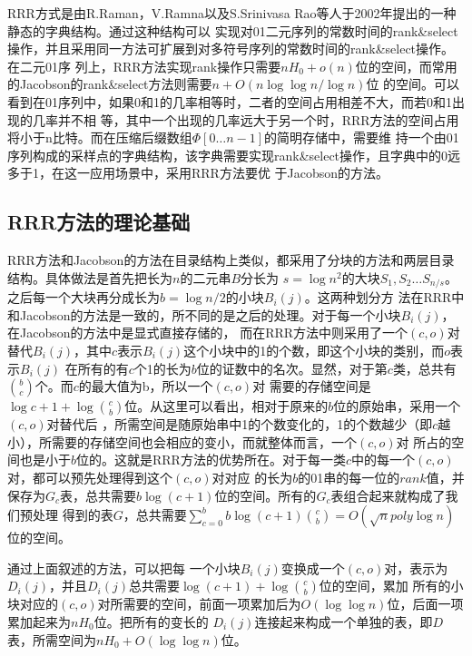 RRR方式是由R.Raman，V.Ramna以及S.Srinivasa Rao等人于2002年提出的一种静态的字典结构\cite{raman2002succinct}。通过这种结构可以
实现对01二元序列的常数时间的rank\&select操作，并且采用同一方法可扩展到对多符号序列的常数时间的rank\&select操作。在二元01序
列上，RRR方法实现rank操作只需要$nH_0 + o(n)$位的空间，而常用的Jacobson的rank\&select方法则需要$n + O(n\log\log n/\log n)$位
的空间\cite{jacobson1989space}。可以看到在01序列中，如果0和1的几率相等时，二者的空间占用相差不大，而若0和1出现的几率并不相
等，其中一个出现的几率远大于另一个时，RRR方法的空间占用将小于n比特。而在压缩后缀数组$\Phi[0\ldots n-1]$的简明存储中，需要维
持一个由01序列构成的采样点的字典结构，该字典需要实现rank\&select操作，且字典中的0远多于1，在这一应用场景中，采用RRR方法要优
于Jacobson的方法。

\subsection{RRR方法的理论基础}\label{chap:sub1}
RRR方法和Jacobson的方法在目录结构上类似，都采用了分块的方法和两层目录结构。具体做法是首先把长为$n$的二元串$B$分长为
$s = \log n^2$的大块$S_1, S_2\ldots S_{n/s}$。之后每一个大块再分成长为$b = \log {n/2}$的小块$B_i(j)$。这两种划分方
法在RRR中和Jacobson的方法是一致的，所不同的是之后的处理。对于每一个小块$B_i(j)$，在Jacobson的方法中是显式直接存储的，
而在RRR方法中则采用了一个$(c, o)$对替代$B_i(j)$，其中$c$表示$B_i(j)$这个小块中的1的个数，即这个小块的类别，而$o$表示$B_i(j)$
在所有的有$c$个1的长为$b$位的证数中的名次。显然，对于第$c$类，总共有$\binom{b}{c}$个。而$c$的最大值为b，所以一个$(c, o)$对
需要的存储空间是$\log{c + 1} + \log{\binom{c}{b}}$位。从这里可以看出，相对于原来的$b$位的原始串，采用一个$(c, o)$对替代后
，所需空间是随原始串中1的个数变化的，1的个数越少（即$c$越小），所需要的存储空间也会相应的变小，而就整体而言，一个$(c, o)$对
所占的空间也是小于$b$位的。这就是RRR方法的优势所在。对于每一类$c$中的每一个$(c, o)$对，都可以预先处理得到这个$(c, o)$对对应
的长为$b$的01串的每一位的$rank$值，并保存为$G_c$表，总共需要$b\log(c + 1)$位的空间。所有的$G_c$表组合起来就构成了我们预处理
得到的表$G$，总共需要$\sum_{c=0}^b {b\log (c+1)\binom{c}{b}=O(\sqrt{n}poly \log n)}$位的空间。

通过上面叙述的方法，可以把每
一个小块$B_i(j)$变换成一个$(c, o)$对，表示为$D_i(j)$，并且$D_i(j)$总共需要$\log(c + 1) + \log\binom{c}{b}$位的空间，累加
所有的小块对应的$(c, o)$对所需要的空间，前面一项累加后为$O(\log\log n)$位，后面一项累加起来为$nH_0$位。把所有的变长的
$D_i(j)$连接起来构成一个单独的表，即$D$表，所需空间为$nH_0 + O(\log\log n)$位。

